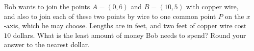 Bob wants to join the points $A=(0,6)$ and $B=(10,5)$ with copper wire, and also to join each of these two points by wire to one common point $P$ on the $x$-axis, which he may choose. Lengths are in feet, and two feet of copper wire cost $10$ dollars. What is the least amount of money Bob needs to spend? Round your answer to the nearest dollar.
